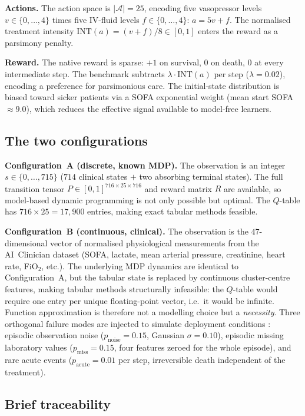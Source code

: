 \documentclass[11pt,a4paper]{article}
\begin{document}
\textbf{Actions.} The action space is $|\mathcal{A}|=25$, encoding five vasopressor
levels $v\in\{0,\ldots,4\}$ times five IV-fluid levels $f\in\{0,\ldots,4\}$:
$a=5v+f$. The normalised treatment intensity $\mathrm{INT}(a)=(v+f)/8\in[0,1]$
enters the reward as a parsimony penalty.

\textbf{Reward.} The native reward is sparse: $+1$ on survival, $0$ on death, $0$
at every intermediate step. The benchmark subtracts $\lambda\cdot\mathrm{INT}(a)$
per step ($\lambda=0.02$), encoding a preference for parsimonious care. The
initial-state distribution is biased toward sicker patients via a SOFA exponential
weight (mean start SOFA $\approx9.0$), which reduces the effective signal available
to model-free learners.

\subsection{The two configurations}
\label{sec:configs}

\textbf{Configuration~A (discrete, known MDP).} The observation is an integer
$s\in\{0,\ldots,715\}$ ($714$ clinical states $+$ two absorbing terminal states).
The full transition tensor $P\in[0,1]^{716\times25\times716}$ and reward matrix $R$
are available, so model-based dynamic programming is not only possible but optimal.
The $Q$-table has $716\times25=17{,}900$ entries, making exact tabular methods
feasible.

\textbf{Configuration~B (continuous, clinical).} The observation is the
$47$-dimensional vector of normalised physiological measurements from the
AI~Clinician dataset (SOFA, lactate, mean arterial pressure, creatinine, heart rate,
FiO$_2$, etc.). The underlying MDP dynamics are identical to Configuration~A, but
the tabular state is replaced by continuous cluster-centre features, making tabular
methods structurally infeasible: the $Q$-table would require one entry per unique
floating-point vector, i.e.\ it would be infinite. Function approximation is
therefore not a modelling choice but a \emph{necessity}. Three orthogonal failure
modes are injected to simulate deployment conditions \cite{gottesman2019}: episodic
observation noise ($p_{\text{noise}}=0.15$, Gaussian $\sigma=0.10$), episodic
missing laboratory values ($p_{\text{miss}}=0.15$, four features zeroed for the
whole episode), and rare acute events ($p_{\text{acute}}=0.01$ per step,
irreversible death independent of the treatment).

\subsection{Brief traceability}
\label{sec:trace}
\end{document}
